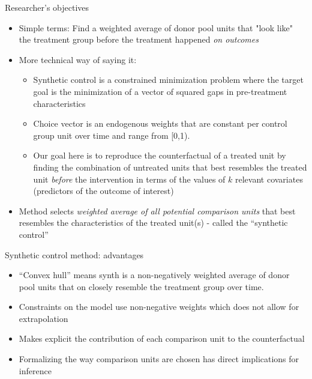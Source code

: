 \documentclass{beamer}
\begin{document}
\begin{frame}{Researcher's objectives}

\begin{itemize}
	\item Simple terms: Find a weighted average of donor pool units that "look like" the treatment group before the treatment happened \emph{on outcomes}
	\item More technical way of saying it:
		\begin{itemize}
		\item Synthetic control is a constrained minimization problem where the target goal is the minimization of a vector of squared gaps in pre-treatment characteristics
	\item Choice vector is an endogenous weights that are constant per control group unit over time and range from [0,1). 
	\item Our goal here is to reproduce the counterfactual of a treated unit by finding the combination of untreated units that best resembles the treated unit \emph{before} the intervention in terms of the values of $k$ relevant covariates (predictors of the outcome of interest)
		\end{itemize}
	\item Method selects \emph{weighted average of all potential comparison units} that best resembles the characteristics of the treated unit(s) - called the ``synthetic control''
\end{itemize}

\end{frame}



\begin{frame}{Synthetic control method: advantages}
	
	\begin{itemize}
	\item ``Convex hull'' means synth is a non-negatively weighted average of donor pool units that on closely resemble the treatment group over time.
	\item Constraints on the model use non-negative weights which does not allow for extrapolation 
	\item Makes explicit the contribution of each comparison unit to the counterfactual 
	\item Formalizing the way comparison units are chosen has direct implications for inference
	\end{itemize}
\end{frame}
\end{document}
